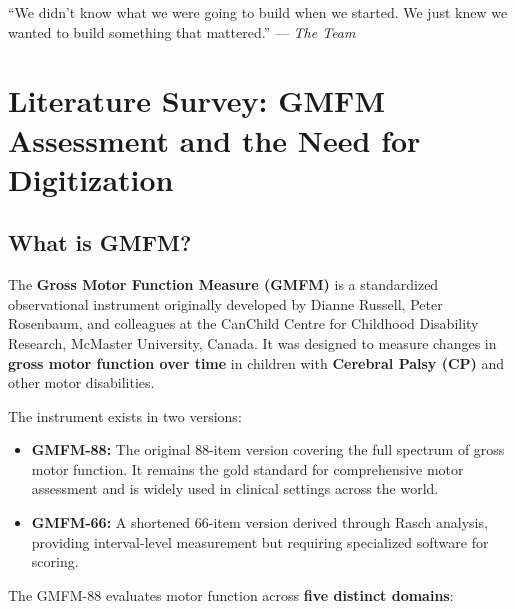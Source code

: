 \documentclass[11pt,a4paper]{article}
\begin{document}
\begin{quotecallout}
``We didn't know what we were going to build when we started. We just knew we wanted to build something that mattered.'' --- \textit{The Team}
\end{quotecallout}

\section{Literature Survey: GMFM Assessment and the Need for Digitization}

\subsection{What is GMFM?}

The \textbf{Gross Motor Function Measure (GMFM)} is a standardized observational instrument originally developed by Dianne Russell, Peter Rosenbaum, and colleagues at the CanChild Centre for Childhood Disability Research, McMaster University, Canada. It was designed to measure changes in \textbf{gross motor function over time} in children with \textbf{Cerebral Palsy (CP)} and other motor disabilities.

The instrument exists in two versions:

\begin{itemize}[leftmargin=2em, itemsep=3pt]
    \item \textbf{GMFM-88:} The original 88-item version covering the full spectrum of gross motor function. It remains the gold standard for comprehensive motor assessment and is widely used in clinical settings across the world.
    \item \textbf{GMFM-66:} A shortened 66-item version derived through Rasch analysis, providing interval-level measurement but requiring specialized software for scoring.
\end{itemize}

The GMFM-88 evaluates motor function across \textbf{five distinct domains}:
\end{document}
